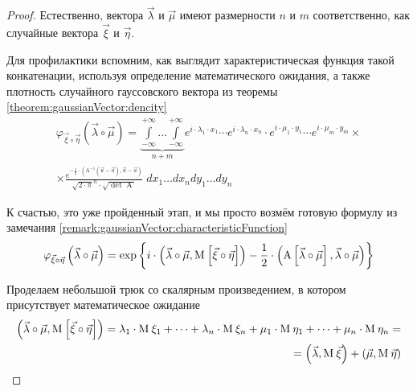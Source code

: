\begin{proof}
    Естественно, вектора $\vec{\lambda}$ и $\vec{\mu}$ имеют размерности $n$
    и $m$ соответственно, как случайные вектора $\vec{\xi}$ и $\vec{\eta}$.

    Для профилактики вспомним, как выглядит характеристическая функция такой
    конкатенации, используя определение математического ожидания, а также
    плотность случайного гауссовского вектора
    из теоремы \ref{theorem:gaussianVector:dencity}
    \begin{align*}
        \varphi_{\vec{\xi} \circ \vec{\eta}}\left(
            \vec{\lambda} \circ \vec{\mu} \right)
        = \underbrace{\int\limits_{-\infty}^{+\infty} \dots
                \int\limits_{-\infty}^{+\infty}}_{n+m}
            e^{i \cdot \lambda_1 \cdot x_1}
                \cdots e^{i \cdot \lambda_n \cdot x_n}
                \cdot e^{i \cdot \mu_1 \cdot y_1}
                \cdots e^{i \cdot \mu_m \cdot y_m} \times \\
            \times
            \frac{e^{-\frac{1}{2} \cdot \left(
                \operatorname{A^{-1}} \left( \vec{u} - \vec{a} \right),
                \vec{u} - \vec{a} \right)}}{\sqrt{2 \cdot \pi}^n
                    \cdot \sqrt{\det{\operatorname{A}}}}
                \;dx_1 \dots dx_n dy_1 \dots dy_n
    \end{align*}

    К счастью, это уже пройденный этап, и мы просто возмём готовую формулу из
    замечания \ref{remark:gaussianVector:characteristicFunction}
    \begin{equation}\label{eq:concatinationCFStart}
        \varphi_{\vec{\xi} \circ \vec{\eta}}\left(
            \vec{\lambda} \circ \vec{\mu} \right)
        = \exp{\left\{
                i \cdot \left( \vec{\lambda} \circ \vec{\mu},
                    \operatorname{M}_{} \left[ \vec{\xi} \circ \vec{\eta} \right] \right)
                - \frac{1}{2} \cdot \left( \operatorname{A}
                    \left[ \vec{\lambda} \circ \vec{\mu} \right],
                    \vec{\lambda} \circ \vec{\mu} \right)
            \right\}}
    \end{equation}

    Проделаем небольшой трюк со скалярным произведением, в котором присутствует
    математическое ожидание
    \begin{align*}
        \left( \vec{\lambda} \circ \vec{\mu},
            \operatorname{M}_{} \left[ \vec{\xi} \circ \vec{\eta} \right] \right)
        = \lambda_1 \cdot \operatorname{M}_{} \xi_1 + \dots + \lambda_n \cdot \operatorname{M}_{} \xi_n +
            \mu_1 \cdot \operatorname{M}_{} \eta_1 + \dots + \mu_n \cdot \operatorname{M}_{} \eta_n = \\
        = \left( \vec{\lambda}, \operatorname{M}_{} \vec{\xi} \right)
            + \left( \vec{\mu}, \operatorname{M}_{} \vec{\eta} \right)
    \end{align*}


\end{proof}
